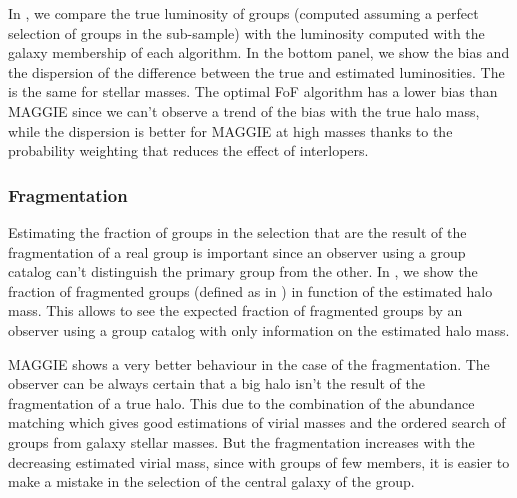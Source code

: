 In , we compare the true luminosity of groups
(computed assuming a perfect selection of groups in the sub-sample) with the
luminosity computed with the galaxy membership of each algorithm. In the bottom
panel, we show the bias and the dispersion of the difference between the true
and estimated luminosities. The  is the
same for stellar masses. The optimal FoF algorithm has a lower bias than MAGGIE
since we can't observe a trend of the bias with the true halo mass, while the
dispersion is better for MAGGIE at high masses thanks to the probability
weighting that reduces the effect of interlopers.

\subsubsection{Fragmentation}

Estimating the fraction of groups in the selection that are the result of the
fragmentation of a real group is important since an observer using a group
catalog can't distinguish the primary group from the other. In
, we show the fraction of fragmented groups (defined
as in ) in function of the
estimated halo mass. This allows to see the expected fraction of fragmented
groups by an observer using a group catalog with only information on the
estimated halo mass.

MAGGIE shows a very better behaviour in the case of the fragmentation. The
observer can be always certain that a big halo isn't the result of the
fragmentation of a true halo. This due to the combination of the abundance
matching which gives good estimations of virial masses and the ordered search
of groups from galaxy stellar masses. But the fragmentation increases with the
decreasing estimated virial mass, since with groups of few members, it is
easier to make a mistake in the selection of the central galaxy of the group.

